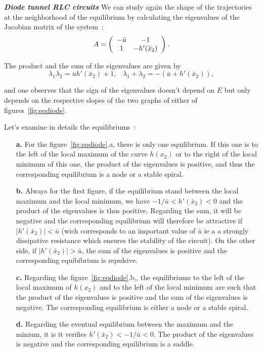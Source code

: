 {\begin{exemple} {\bf  \em Diode tunnel RLC circuits}
We can study again the shape of the trajectories at the neighborhood of the equilibrium by calculating the eigenvalues of the Jacobian matrix of the system~:
$$A=\bma{cc} -\bar u & -1\\1&-h'(\bar x_2)\ema .$$

The product and the sum of the eigenvalues are given by
$$ \lambda_1\lambda_2=\bar u h'(\bar x_2) +1,  \;\;\; \lambda_1+\lambda_2=-(\bar u+
h'(\bar x_2)),$$

and one observes that the sign of the eigenvalues doesn't depend on $E$ but only depends on the respective slopes of the two graphs of either of figures~\ref{fig:eqdiode}.

Let's examine in details the equilibriums~:

\begin{itemize}

\item[{\bf a.}] For the figure~\ref{fig:eqdiode}.a, there is only one equilibrium. If this one 
is to the left of the local maximum of the curve $h(x_2)$ or to the right of the local minimum of this one, the product
of the eigenvalues is positive, and thus the corresponding equilibrium is a node or a stable spiral.

\item[{\bf b.} ] Always for the first figure, if the equilibrium stand between the local maximum and the local minimum, 
we have $-1/\bar u < h'(\bar x_2)<0$ and the product of the eigenvalues
is thus positive.
Regarding the sum, it will be negative and the corresponding equilibrium
will therefore be attractive if $|h'(\bar x_2)|<\bar u$ (wich corresponds to an important value of $\bar u$ ie a 
a strongly dissipative resistance which ensures the stability of the circuit). On the other side, if $|h'(\bar x_2)|>\bar u$,
the sum of the eigenvalues is positive and the corresponding equibibrium is repulsive.

\item[{\bf c.}] Regarding the figure~\ref{fig:eqdiode}.b,, the equilibriums to the left of the local maximum of 
$h(x_2)$ and to the left of the local minimum are such that the product of the eigenvalues is positive and the sum of the eigenvalues
is negative. The corresponding equilibrium is either a node or a stable spiral.

\item[{\bf d.}] Regarding the eventual equilibrium between the maximum and the minium, it is it verifies $h'(\bar x_2) < -1/\bar u < 0$. The product of the
eigenvalues is negative and the corresponding equilibrium is a saddle.


\end{itemize}
\end{exemple}}
